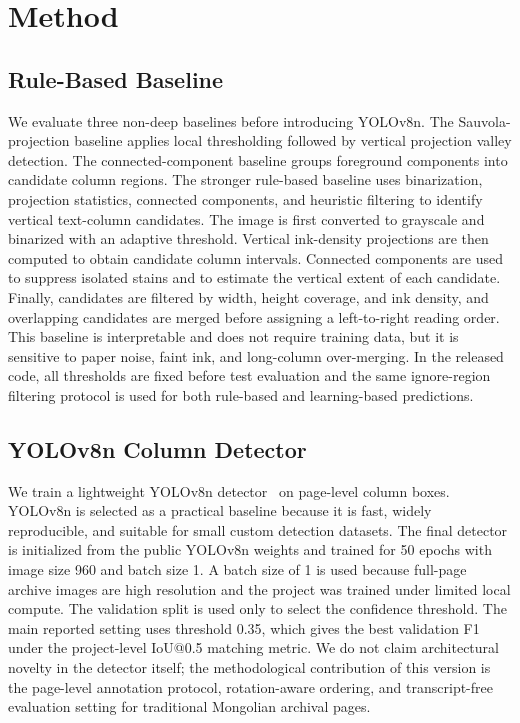 \documentclass[pdflatex,sn-mathphys-num]{sn-jnl}
\begin{document}
\section{Method}
\subsection{Rule-Based Baseline}
We evaluate three non-deep baselines before introducing YOLOv8n. The Sauvola-projection baseline applies local thresholding followed by vertical projection valley detection. The connected-component baseline groups foreground components into candidate column regions. The stronger rule-based baseline uses binarization, projection statistics, connected components, and heuristic filtering to identify vertical text-column candidates. The image is first converted to grayscale and binarized with an adaptive threshold. Vertical ink-density projections are then computed to obtain candidate column intervals. Connected components are used to suppress isolated stains and to estimate the vertical extent of each candidate. Finally, candidates are filtered by width, height coverage, and ink density, and overlapping candidates are merged before assigning a left-to-right reading order. This baseline is interpretable and does not require training data, but it is sensitive to paper noise, faint ink, and long-column over-merging. In the released code, all thresholds are fixed before test evaluation and the same ignore-region filtering protocol is used for both rule-based and learning-based predictions.

\subsection{YOLOv8n Column Detector}
We train a lightweight YOLOv8n detector~\cite{jocher2023yolov8} on page-level column boxes. YOLOv8n is selected as a practical baseline because it is fast, widely reproducible, and suitable for small custom detection datasets. The final detector is initialized from the public YOLOv8n weights and trained for 50 epochs with image size 960 and batch size 1. A batch size of 1 is used because full-page archive images are high resolution and the project was trained under limited local compute. The validation split is used only to select the confidence threshold. The main reported setting uses threshold 0.35, which gives the best validation F1 under the project-level IoU@0.5 matching metric. We do not claim architectural novelty in the detector itself; the methodological contribution of this version is the page-level annotation protocol, rotation-aware ordering, and transcript-free evaluation setting for traditional Mongolian archival pages.
\end{document}
